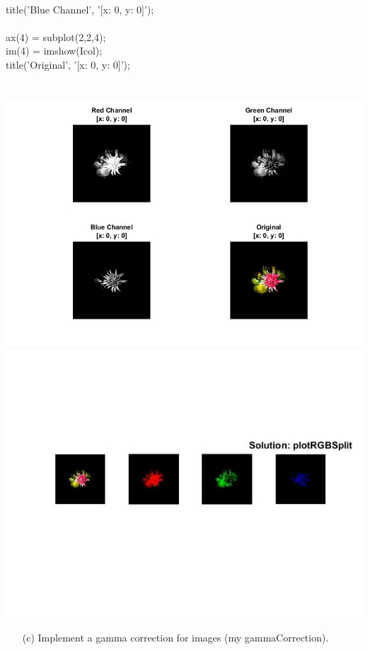         \\ title({'Blue Channel', '[x: 0, y: 0]'});
        \\
        \\ ax(4) = subplot(2,2,4);
        \\ im(4) = imshow(Icol);
        \\ title({'Original', '[x: 0, y: 0]'});
        \\\\\
        \includegraphics[scale=0.5]{images/SolutionSecPart.jpg} 
        \includegraphics[scale=0.7]{images/SolutionThreethPart.jpg} 
        \\ \pagebreak
    \begin{enumerate}        
        \item[(c)] Implement a gamma correction for images (my gammaCorrection).
        \\
    \end{enumerate}
